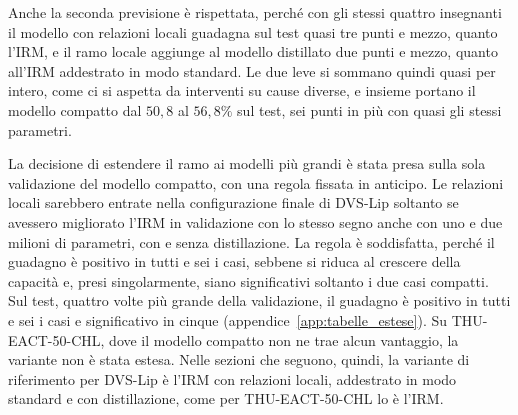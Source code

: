 Anche la seconda previsione è rispettata, perché con gli stessi quattro insegnanti il modello con relazioni locali guadagna sul test quasi tre punti e mezzo, quanto l'IRM, e il ramo locale aggiunge al modello distillato due punti e mezzo, quanto all'IRM addestrato in modo standard. Le due leve si sommano quindi quasi per intero, come ci si aspetta da interventi su cause diverse, e insieme portano il modello compatto dal $50{,}8$ al $56{,}8\%$ sul test, sei punti in più con quasi gli stessi parametri.

La decisione di estendere il ramo ai modelli più grandi è stata presa sulla sola validazione del modello compatto, con una regola fissata in anticipo. Le relazioni locali sarebbero entrate nella configurazione finale di DVS-Lip soltanto se avessero migliorato l'IRM in validazione con lo stesso segno anche con uno e due milioni di parametri, con e senza distillazione. La regola è soddisfatta, perché il guadagno è positivo in tutti e sei i casi, sebbene si riduca al crescere della capacità e, presi singolarmente, siano significativi soltanto i due casi compatti. Sul test, quattro volte più grande della validazione, il guadagno è positivo in tutti e sei i casi e significativo in cinque (appendice~\ref{app:tabelle_estese}). Su THU-EACT-50-CHL, dove il modello compatto non ne trae alcun vantaggio, la variante non è stata estesa. Nelle sezioni che seguono, quindi, la variante di riferimento per DVS-Lip è l'IRM con relazioni locali, addestrato in modo standard e con distillazione, come per THU-EACT-50-CHL lo è l'IRM.



